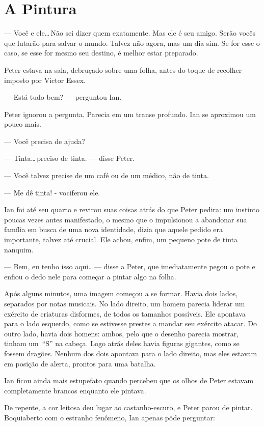 \chapter{A Pintura}

--- Você e ele\ldots\,Não sei dizer quem exatamente. Mas ele é seu
amigo.  Serão vocês que lutarão para salvar o mundo. Talvez não agora,
mas um dia sim. Se for esse o caso, se esse for mesmo seu destino, é
melhor estar preparado.

Peter estava na sala, debruçado sobre uma folha, antes do toque de
recolher imposto por Victor Essex.

--- Está tudo bem? --- perguntou Ian.

Peter ignorou a pergunta. Parecia em um transe profundo. Ian se
aproximou um pouco mais.

--- Você precisa de ajuda?

--- Tinta\ldots\,preciso de tinta. --- disse Peter.

--- Você talvez precise de um café ou de um médico, não de tinta.

--- Me dê tinta! - vociferou ele.

Ian foi até seu quarto e revirou suas coisas atrás do que Peter pedira:
um instinto poucas vezes antes manifestado, o mesmo que o impulsionou a
abandonar sua família em busca de uma nova identidade, dizia que aquele
pedido era importante, talvez até crucial. Ele achou, enfim, um pequeno
pote de tinta nanquim.

--- Bem, eu tenho isso aqui\ldots\,--- disse a Peter, que imediatamente
pegou o pote e enfiou o dedo nele para começar a pintar algo na folha.

Após alguns minutos, uma imagem começou a se formar. Havia dois lados,
separados por notas musicais. No lado direito, um homem parecia liderar
um exército de criaturas disformes, de todos os tamanhos possíveis. Ele
apontava para o lado esquerdo, como se estivesse prestes a mandar seu
exército atacar. Do outro lado, havia dois homens: ambos, pelo que o
desenho parecia mostrar, tinham um~“S” na cabeça. Logo atrás deles havia
figuras gigantes, como se fossem dragões. Nenhum dos dois apontava para
o lado direito, mas eles estavam em posição de alerta, prontos para uma
batalha.

Ian ficou ainda mais estupefato quando percebeu que os olhos de Peter
estavam completamente brancos enquanto ele pintava.

De repente, a cor leitosa deu lugar ao castanho-escuro, e Peter parou de
pintar. Boquiaberto com o estranho fenômeno, Ian apenas pôde perguntar:

